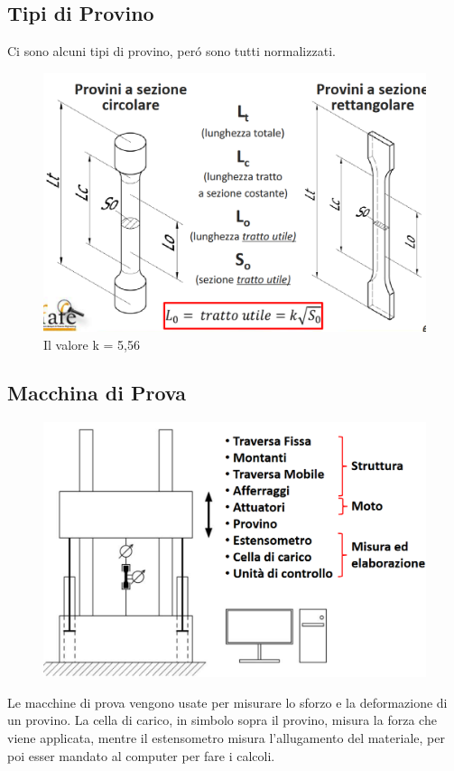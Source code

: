 \documentclass{article}
\begin{document}
        \subsection{Tipi di Provino}
            Ci sono alcuni tipi di provino, per\'o sono tutti normalizzati.
            \begin{figure}[!h]
                \centering
                \includegraphics[width=.85\linewidth]{Diagramma tipi di provino.png}
                \caption{Il valore k = 5,56}
                \label{fig:my_label}
            \end{figure}
        \newpage
        \subsection{Macchina di Prova}
            \begin{figure}[h!]
                \centering
                \includegraphics[width=.85\linewidth]{Diagramma macchina di prova.png}
            \end{figure}
            Le macchine di prova vengono usate per misurare lo sforzo e la deformazione di un provino. La cella di carico, in simbolo sopra il provino, misura la forza che viene applicata, mentre il estensometro misura l'allugamento del materiale, per poi esser mandato al computer per fare i calcoli.
\end{document}
